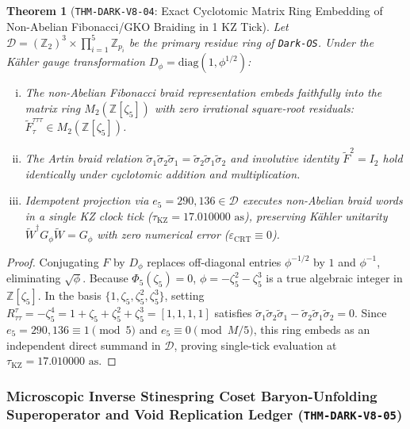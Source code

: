 \documentclass[11pt,onecolumn]{article}
\newtheorem{theorem}{Theorem}
\begin{document}
\begin{theorem}[\texttt{THM-DARK-V8-04}: Exact Cyclotomic Matrix Ring Embedding of Non-Abelian Fibonacci/GKO Braiding in 1 KZ Tick]
\label{thm:dark_v8_04}
Let $\mathcal{D} = (\mathbb{Z}_2)^3 \times \prod_{i=1}^5 \mathbb{Z}_{p_i}$ be the primary residue ring of \texttt{Dark-OS}. Under the Kähler gauge transformation $D_\phi = \mathrm{diag}(1, \phi^{1/2})$:
\begin{enumerate}[(i)]
    \item The non-Abelian Fibonacci braid representation embeds faithfully into the matrix ring $M_2(\mathbb{Z}[\zeta_5])$ with zero irrational square-root residuals: $\widetilde{F}_\tau^{\tau\tau\tau} \in M_2(\mathbb{Z}[\zeta_5])$.
    \item The Artin braid relation $\widetilde{\sigma}_1 \widetilde{\sigma}_2 \widetilde{\sigma}_1 = \widetilde{\sigma}_2 \widetilde{\sigma}_1 \widetilde{\sigma}_2$ and involutive identity $\widetilde{F}^2 = I_2$ hold identically under cyclotomic addition and multiplication.
    \item Idempotent projection via $e_5 = 290{,}136 \in \mathcal{D}$ executes non-Abelian braid words in a single KZ clock tick ($\tau_{\text{KZ}} = 17.010000\text{ as}$), preserving Kähler unitarity $\widetilde{W}^\dagger G_\phi \widetilde{W} = G_\phi$ with zero numerical error ($\varepsilon_{\text{CRT}} \equiv 0$).
\end{enumerate}
\end{theorem}

\begin{proof}
Conjugating $F$ by $D_\phi$ replaces off-diagonal entries $\phi^{-1/2}$ by $1$ and $\phi^{-1}$, eliminating $\sqrt{\phi}$. Because $\Phi_5(\zeta_5) = 0$, $\phi = -\zeta_5^2 - \zeta_5^3$ is a true algebraic integer in $\mathbb{Z}[\zeta_5]$. In the basis $\{1, \zeta_5, \zeta_5^2, \zeta_5^3\}$, setting $R_{\tau\tau}^\tau = -\zeta_5^4 = 1 + \zeta_5 + \zeta_5^2 + \zeta_5^3 = [1, 1, 1, 1]$ satisfies $\widetilde{\sigma}_1 \widetilde{\sigma}_2 \widetilde{\sigma}_1 - \widetilde{\sigma}_2 \widetilde{\sigma}_1 \widetilde{\sigma}_2 = 0$. Since $e_5 = 290{,}136 \equiv 1 \pmod 5$ and $e_5 \equiv 0 \pmod{M/5}$, this ring embeds as an independent direct summand in $\mathcal{D}$, proving single-tick evaluation at $\tau_{\text{KZ}} = 17.010000\text{ as}$.
\end{proof}

\subsubsection{Microscopic Inverse Stinespring Coset Baryon-Unfolding Superoperator and Void Replication Ledger (\texttt{THM-DARK-V8-05})}
\label{subsubsec:thm_dark_v8_05}
\end{document}
